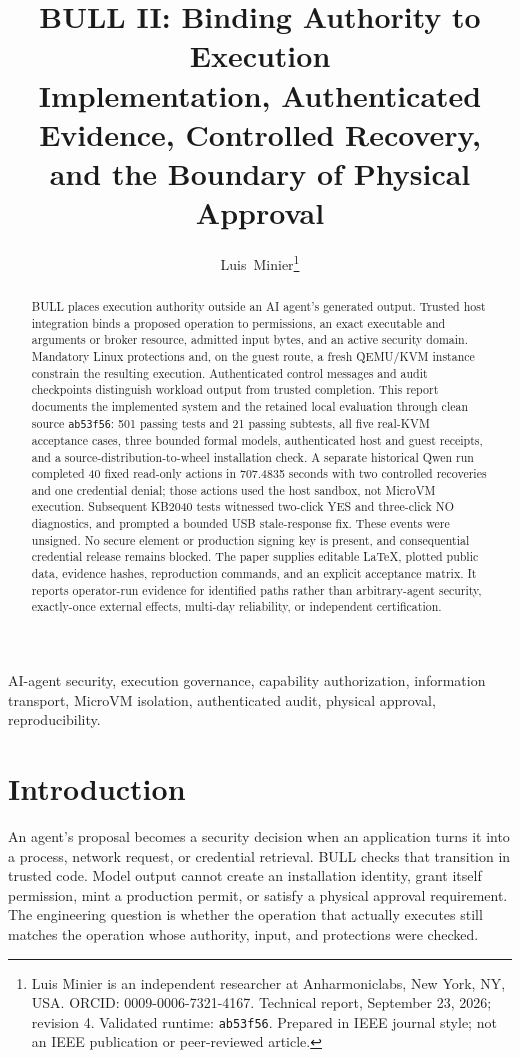 \documentclass[journal]{IEEEtran}
\title{\textbf{BULL II: Binding Authority to Execution}\\[5pt]\large Implementation, Authenticated Evidence, Controlled Recovery,\\and the Boundary of Physical Approval}
\author{Luis~Minier\thanks{Luis Minier is an independent researcher at Anharmoniclabs, New York, NY, USA. ORCID: 0009-0006-7321-4167. Technical report, September 23, 2026; revision 4. Validated runtime: \texttt{ab53f56}. Prepared in IEEE journal style; not an IEEE publication or peer-reviewed article.}}
\newcommand{\code}[1]{\texttt{#1}}
\begin{document}
\raggedbottom
\maketitle
\begin{abstract}
BULL places execution authority outside an AI agent's generated output. Trusted host integration binds a proposed operation to permissions, an exact executable and arguments or broker resource, admitted input bytes, and an active security domain. Mandatory Linux protections and, on the guest route, a fresh QEMU/KVM instance constrain the resulting execution. Authenticated control messages and audit checkpoints distinguish workload output from trusted completion. This report documents the implemented system and the retained local evaluation through clean source \code{ab53f56}: 501 passing tests and 21 passing subtests, all five real-KVM acceptance cases, three bounded formal models, authenticated host and guest receipts, and a source-distribution-to-wheel installation check. A separate historical Qwen run completed 40 fixed read-only actions in 707.4835 seconds with two controlled recoveries and one credential denial; those actions used the host sandbox, not MicroVM execution. Subsequent KB2040 tests witnessed two-click YES and three-click NO diagnostics, and prompted a bounded USB stale-response fix. These events were unsigned. No secure element or production signing key is present, and consequential credential release remains blocked. The paper supplies editable LaTeX, plotted public data, evidence hashes, reproduction commands, and an explicit acceptance matrix. It reports operator-run evidence for identified paths rather than arbitrary-agent security, exactly-once external effects, multi-day reliability, or independent certification.
\end{abstract}
\begin{IEEEkeywords}
AI-agent security, execution governance, capability authorization, information transport, MicroVM isolation, authenticated audit, physical approval, reproducibility.
\end{IEEEkeywords}

\section{Introduction}
An agent's proposal becomes a security decision when an application turns it into a process, network request, or credential retrieval. BULL checks that transition in trusted code. Model output cannot create an installation identity, grant itself permission, mint a production permit, or satisfy a physical approval requirement. The engineering question is whether the operation that actually executes still matches the operation whose authority, input, and protections were checked.
\end{document}
